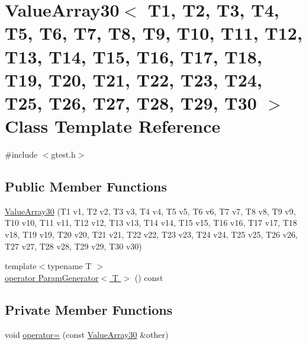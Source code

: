 \hypertarget{classtesting_1_1internal_1_1ValueArray30}{\section{\-Value\-Array30$<$ \-T1, \-T2, \-T3, \-T4, \-T5, \-T6, \-T7, \-T8, \-T9, \-T10, \-T11, \-T12, \-T13, \-T14, \-T15, \-T16, \-T17, \-T18, \-T19, \-T20, \-T21, \-T22, \-T23, \-T24, \-T25, \-T26, \-T27, \-T28, \-T29, \-T30 $>$ \-Class \-Template \-Reference}
\label{db/d20/classtesting_1_1internal_1_1ValueArray30}
}


{\ttfamily \#include $<$gtest.\-h$>$}

\subsection*{\-Public \-Member \-Functions}
\begin{DoxyCompactItemize}
\item 
\hyperlink{classtesting_1_1internal_1_1ValueArray30_a339e5f9e84086762403e00e0177c8159}{\-Value\-Array30} (\-T1 v1, \-T2 v2, \-T3 v3, \-T4 v4, \-T5 v5, \-T6 v6, \-T7 v7, \-T8 v8, \-T9 v9, \-T10 v10, \-T11 v11, \-T12 v12, \-T13 v13, \-T14 v14, \-T15 v15, \-T16 v16, \-T17 v17, \-T18 v18, \-T19 v19, \-T20 v20, \-T21 v21, \-T22 v22, \-T23 v23, \-T24 v24, \-T25 v25, \-T26 v26, \-T27 v27, \-T28 v28, \-T29 v29, \-T30 v30)
\item 
{\footnotesize template$<$typename T $>$ }\\\hyperlink{classtesting_1_1internal_1_1ValueArray30_a08ef46fa12c9dd8ef6fc630baeea89b7}{operator Param\-Generator$<$ T $>$} () const 
\end{DoxyCompactItemize}
\subsection*{\-Private \-Member \-Functions}
\begin{DoxyCompactItemize}
\item 
void \hyperlink{classtesting_1_1internal_1_1ValueArray30_a8c24fb953b122b860974a5d9f0e04240}{operator=} (const \hyperlink{classtesting_1_1internal_1_1ValueArray30}{\-Value\-Array30} \&other)
\end{DoxyCompactItemize}
